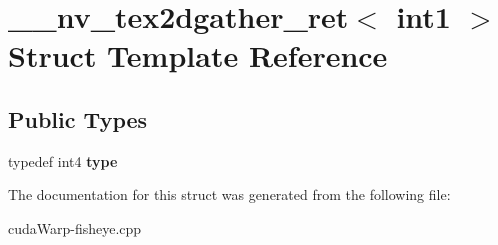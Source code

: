 \hypertarget{struct____nv__tex2dgather__ret_3_01int1_01_4}{}\section{\+\_\+\+\_\+nv\+\_\+tex2dgather\+\_\+ret$<$ int1 $>$ Struct Template Reference}
\label{struct____nv__tex2dgather__ret_3_01int1_01_4}
\subsection*{Public Types}
\begin{DoxyCompactItemize}
\item 
typedef int4 {\bfseries type}\hypertarget{struct____nv__tex2dgather__ret_3_01int1_01_4_a0916ee01e311a9bb1a64ea3b02c80e01}{}\label{struct____nv__tex2dgather__ret_3_01int1_01_4_a0916ee01e311a9bb1a64ea3b02c80e01}

\end{DoxyCompactItemize}


The documentation for this struct was generated from the following file\+:\begin{DoxyCompactItemize}
\item 
cuda\+Warp-\/fisheye.\+cpp\end{DoxyCompactItemize}
